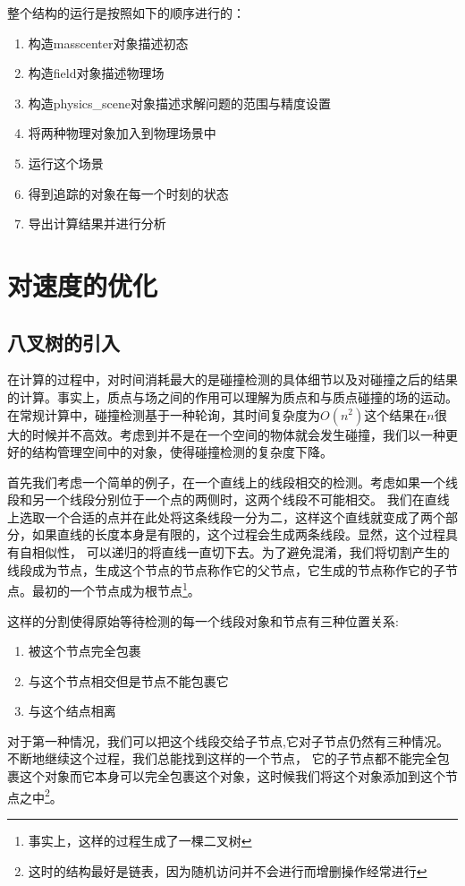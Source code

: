 整个结构的运行是按照如下的顺序进行的：
\begin{enumerate}
    \item 构造masscenter对象描述初态
    \item 构造field对象描述物理场
    \item 构造physics\_scene对象描述求解问题的范围与精度设置
    \item 将两种物理对象加入到物理场景中
    \item 运行这个场景
    \item 得到追踪的对象在每一个时刻的状态
    \item 导出计算结果并进行分析
\end{enumerate}

\section{对速度的优化}
\subsection{八叉树的引入}
在计算的过程中，对时间消耗最大的是碰撞检测的具体细节以及对碰撞之后的结果的计算。事实上，质点与场之间的作用可以理解为质点和与质点碰撞的场的运动。
在常规计算中，碰撞检测基于一种轮询，其时间复杂度为$O(n^2)$这个结果在$n$很大的时候并不高效。考虑到并不是在一个空间的物体就会发生碰撞，我们以一种更好的结构管理空间中的对象，使得碰撞检测的复杂度下降。

首先我们考虑一个简单的例子，在一个直线上的线段相交的检测。考虑如果一个线段和另一个线段分别位于一个点的两侧时，这两个线段不可能相交。
我们在直线上选取一个合适的点并在此处将这条线段一分为二，这样这个直线就变成了两个部分，如果直线的长度本身是有限的，这个过程会生成两条线段。显然，这个过程具有自相似性，
可以递归的将直线一直切下去。为了避免混淆，我们将切割产生的线段成为节点，生成这个节点的节点称作它的父节点，它生成的节点称作它的子节点。最初的一个节点成为根节点\footnote{事实上，这样的过程生成了一棵二叉树}。

这样的分割使得原始等待检测的每一个线段对象和节点有三种位置关系:
\begin{enumerate}
    \item 被这个节点完全包裹
    \item 与这个节点相交但是节点不能包裹它
    \item 与这个结点相离
\end{enumerate}

对于第一种情况，我们可以把这个线段交给子节点,它对子节点仍然有三种情况。不断地继续这个过程，我们总能找到这样的一个节点，
它的子节点都不能完全包裹这个对象而它本身可以完全包裹这个对象，这时候我们将这个对象添加到这个节点之中\footnote{这时的结构最好是链表，因为随机访问并不会进行而增删操作经常进行}。

